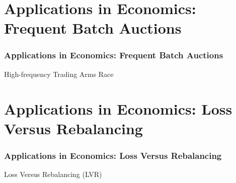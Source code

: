 \documentclass{beamer}
\begin{document}
\section{Applications in Economics: Frequent Batch Auctions}
\begin{frame}
    \frametitle{Applications in Economics: Frequent Batch Auctions}
    \begin{block}{High-frequency Trading Arms Race}
    \end{block}
\end{frame}

\section{Applications in Economics: Loss Versus Rebalancing}
\begin{frame}
    \frametitle{Applications in Economics: Loss Versus Rebalancing}
    \begin{block}{Loss Versus Rebalancing (LVR)}
    \end{block}
\end{frame}
\end{document}
